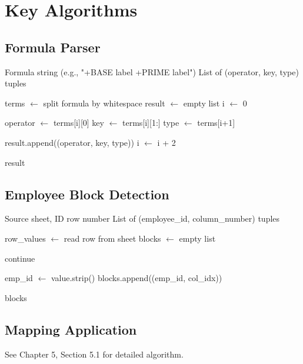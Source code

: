 \section{Key Algorithms}

\subsection{Formula Parser}

\begin{algorithm}[H]
\caption{Parse Formula String}
\begin{algorithmic}[1]
\Require Formula string (e.g., "+BASE label +PRIME label")
\Ensure List of (operator, key, type) tuples

\State terms $\gets$ split formula by whitespace
\State result $\gets$ empty list
\State i $\gets$ 0

    \State operator $\gets$ terms[i][0]  
    \State key $\gets$ terms[i][1:]  
    \State type $\gets$ terms[i+1]  
    
    \State result.append((operator, key, type))
    \State i $\gets$ i + 2
\EndWhile

\State \Return result
\end{algorithmic}
\end{algorithm}

\subsection{Employee Block Detection}

\begin{algorithm}[H]
\caption{Detect Employee Blocks}
\begin{algorithmic}[1]
\Require Source sheet, ID row number
\Ensure List of (employee\_id, column\_number) tuples

\State row\_values $\gets$ read row from sheet
\State blocks $\gets$ empty list

        \State continue  
    \EndIf
    
        \State emp\_id $\gets$ value.strip()
        \State blocks.append((emp\_id, col\_idx))
    \EndIf
\EndFor

\State \Return blocks
\end{algorithmic}
\end{algorithm}

\subsection{Mapping Application}

See Chapter 5, Section 5.1 for detailed algorithm.
